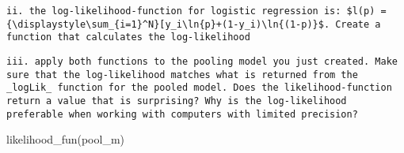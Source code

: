 \documentclass[
]{article}
\newenvironment{Shaded}{\begin{snugshade}}{\end{snugshade}}
\newcommand{\ControlFlowTok}[1]{\textcolor[rgb]{0.13,0.29,0.53}{\textbf{#1}}}
\newcommand{\DecValTok}[1]{\textcolor[rgb]{0.00,0.00,0.81}{#1}}
\newcommand{\FunctionTok}[1]{\textcolor[rgb]{0.00,0.00,0.00}{#1}}
\newcommand{\NormalTok}[1]{#1}
\newcommand{\OtherTok}[1]{\textcolor[rgb]{0.56,0.35,0.01}{#1}}
\newcommand{\SpecialCharTok}[1]{\textcolor[rgb]{0.00,0.00,0.00}{#1}}
\begin{document}
\begin{Shaded}
\end{Shaded}

\begin{verbatim}
ii. the log-likelihood-function for logistic regression is: $l(p) = {\displaystyle\sum_{i=1}^N}[y_i\ln{p}+(1-y_i)\ln{(1-p)}$. Create a function that calculates the log-likelihood  
\end{verbatim}

\begin{Shaded}
\end{Shaded}

\begin{verbatim}
iii. apply both functions to the pooling model you just created. Make sure that the log-likelihood matches what is returned from the _logLik_ function for the pooled model. Does the likelihood-function return a value that is surprising? Why is the log-likelihood preferable when working with computers with limited precision?
\end{verbatim}

\begin{Shaded}
\begin{Highlighting}[]
\FunctionTok{likelihood\_fun}\NormalTok{(pool\_m)}
\end{Highlighting}
\end{Shaded}
\end{document}
